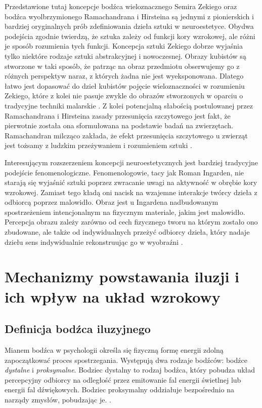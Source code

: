 \documentclass[licencjacka]{kdypl}
\begin{document}
Przedstawione tutaj koncepcje bodźca wieloznacznego Semira Zekiego oraz bodźca wyolbrzymionego Ramachandrana i Hirsteina są jednymi  z pionierskich i bardziej oryginalnych prób  zdefiniowania dzieła sztuki w neuroestetyce. Obydwa podejścia zgodnie twierdzą, że sztuka zależy od funkcji kory wzrokowej, ale różni je sposób rozumienia tych funkcji. Koncepcja sztuki Zekiego dobrze wyjaśnia tylko niektóre rodzaje sztuki abstrakcyjnej i nowoczesnej. Obrazy kubistów są stworzone w taki sposób, że patrząc na obraz przedmiotu obserwujemy go z różnych perspektyw naraz, z których żadna nie jest wyeksponowana. Dlatego łatwo jest dopasować do dzieł kubistów pojęcie wieloznaczności w rozumieniu Zekiego, które z kolei nie pasuje zwykle do obrazów stworzonych w oparciu o tradycyjne techniki malarskie \citep[s. 16-17]{Bremer}. Z kolei potencjalną słabością postulowanej przez Ramachandrana i Hirsteina zasady przesunięcia szczytowego jest fakt, że pierwotnie została ona sformułowana na podstawie badań na zwierzętach. Ramachandran milcząco zakłada, że efekt przesunięcia szczytowego u zwierząt jest tożsamy z ludzkim przeżywaniem i rozumieniem sztuki \citep[s. 23]{Bremer}.

Interesującym rozszerzeniem koncepcji neuroestetycznych jest bardziej tradycyjne podejście fenomenologiczne. Fenomenologowie, tacy jak Roman Ingarden, nie starają się wyjaśnić sztuki poprzez zwracanie uwagi na aktywność w obrębie kory wzrokowej. Zamiast tego kładą oni nacisk na wzajemne interakcje twórcy dzieła z odbiorcą poprzez malowidło. Obraz jest u Ingardena nadbudowanym spostrzeżeniem intencjonalnym na fizycznym materiale, jakim jest malowidło. Percepcja obrazu zależy zarówno od cech fizycznego tworu na którym zostało ono zbudowane, ale także od indywidualnych przeżyć odbiorcy dzieła, który nadaje dziełu sens indywidualnie rekonstruując go w wyobraźni \citep[s. 68-70]{Ingarden1958}.


\chapter{Mechanizmy powstawania iluzji i ich wpływ na układ wzrokowy}

\section{Definicja bodźca iluzyjnego}

Mianem bodźca w psychologii określa się fizyczną formę energii zdolną zapoczątkować proces spostrzegania. Występują dwa rodzaje bodźców: bodźce \textit{dystalne} i \textit{proksymalne}. Bodziec dystalny to rodzaj bodźca, który pobudza układ percepcyjny odbiorcy na odległość przez emitowanie fal energii świetlnej lub energii fal dźwiękowych.  Bodziec proksymalny oddziałuje bezpośrednio na narządy zmysłów, pobudzając je. \citep[s. 23]{Hochberg1970}.
\end{document}
